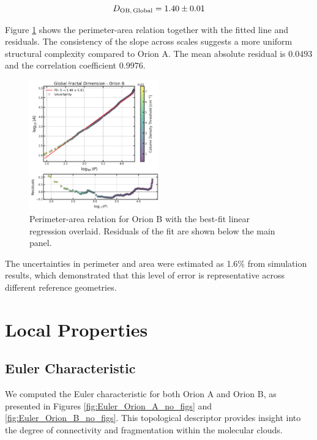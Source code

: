 \begin{equation}
    \notag
    D_{\mathrm{OB,\,Global}} = 1.40 \pm 0.01
\end{equation}

Figure \ref{fig:orion_B_global} shows the perimeter-area relation together with the fitted line and residuals. The consistency of the slope across scales suggests a more uniform structural complexity compared to Orion A. The mean absolute residual is $0.0493$ and the correlation coefficient $0.9976$.

\begin{figure}[t]
    \centering
    \includegraphics[width=0.5\textwidth]{figures/orion_B_global.png}
    \caption{Perimeter-area relation for Orion B with the best-fit linear regression overlaid. Residuals of the fit are shown below the main panel.}
    \label{fig:orion_B_global}
\end{figure}

The uncertainties in perimeter and area were estimated as 1.6\% from simulation results, which demonstrated that this level of error is representative across different reference geometries.

\section{Local Properties}

\subsection{Euler Characteristic}

We computed the Euler characteristic for both Orion A and Orion B, as presented in Figures \ref{fig:Euler_Orion_A_no_figs} and \ref{fig:Euler_Orion_B_no_figs}. This topological descriptor provides insight into the degree of connectivity and fragmentation within the molecular clouds.

